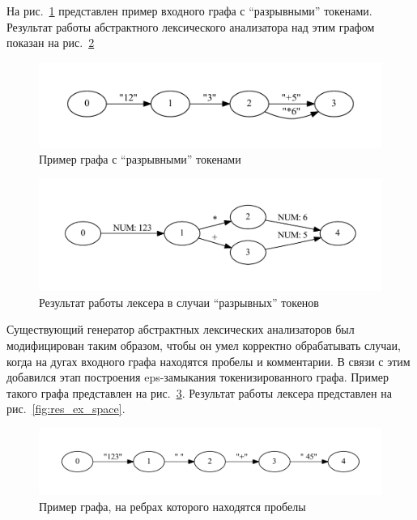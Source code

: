 На рис.~\ref{fig:example_calc_break} представлен пример входного графа с ``разрывными'' токенами. Результат работы абстрактного лексического 
анализатора над этим графом показан на рис.~\ref{fig:res_ex_calc_break}

\begin{figure}[t]
\centering
\includegraphics[width=\textwidth]{Polubelova/example_calc_break}
\caption{Пример графа с ``разрывными'' токенами }
\label{fig:example_calc_break} 
\end{figure}

\begin{figure}[t]
\centering
\includegraphics[width=\textwidth]{Polubelova/res_ex_calc_break}
\caption{Результат работы лексера в случаи ``разрывных'' токенов }
\label{fig:res_ex_calc_break} 
\end{figure}

Существующий генератор абстрактных лексических анализаторов был модифицирован таким образом, чтобы он умел корректно обрабатывать случаи, 
когда на дугах входного графа находятся пробелы и комментарии. В связи с этим добавился этап построения eps-замыкания токенизированного графа.
Пример такого графа представлен на рис.~\ref{fig:example_space}. Результат работы лексера представлен на рис.~\ref{fig:res_ex_space}.

\begin{figure}[t]
\centering
\includegraphics[width=\textwidth]{Polubelova/example_space}
\caption{Пример графа, на ребрах которого находятся пробелы}
\label{fig:example_space} 
\end{figure}

